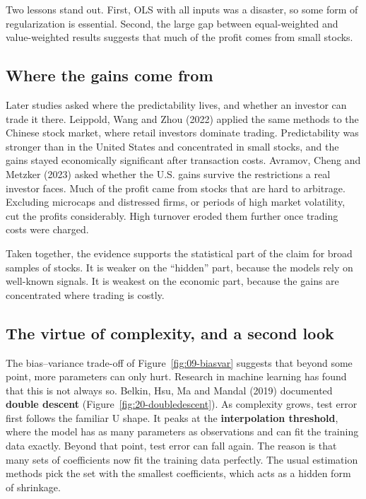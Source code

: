 Two lessons stand out. First, OLS with all inputs was a disaster, so some form of regularization is essential. Second, the large gap between equal-weighted and value-weighted results suggests that much of the profit comes from small stocks.

\subsection{Where the gains come from}

Later studies asked where the predictability lives, and whether an investor can trade it there. Leippold, Wang and Zhou (2022) applied the same methods to the Chinese stock market, where retail investors dominate trading. Predictability was stronger than in the United States and concentrated in small stocks, and the gains stayed economically significant after transaction costs. Avramov, Cheng and Metzker (2023) asked whether the U.S. gains survive the restrictions a real investor faces. Much of the profit came from stocks that are hard to arbitrage. Excluding microcaps and distressed firms, or periods of high market volatility, cut the profits considerably. High turnover eroded them further once trading costs were charged.

Taken together, the evidence supports the statistical part of the claim for broad samples of stocks. It is weaker on the ``hidden'' part, because the models rely on well-known signals. It is weakest on the economic part, because the gains are concentrated where trading is costly.

\subsection{The virtue of complexity, and a second look}
\label{sec:20-complexity}

The bias--variance trade-off of Figure~\ref{fig:09-biasvar} suggests that beyond some point, more parameters can only hurt. Research in machine learning has found that this is not always so. Belkin, Hsu, Ma and Mandal (2019) documented \textbf{double descent} (Figure~\ref{fig:20-doubledescent}). As complexity grows, test error first follows the familiar U shape. It peaks at the \textbf{interpolation threshold}, where the model has as many parameters as observations and can fit the training data exactly. Beyond that point, test error can fall again. The reason is that many sets of coefficients now fit the training data perfectly. The usual estimation methods pick the set with the smallest coefficients, which acts as a hidden form of shrinkage.

